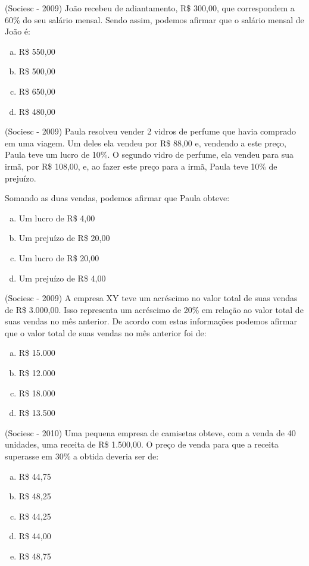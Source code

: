  \begin{exer}
 (Sociesc - 2009) João recebeu de adiantamento, R\$ 300,00, que correspondem a 60\% do seu salário mensal. Sendo assim, podemos afirmar que o salário mensal de João é:
 \begin{enumerate}[a)]
  \item R\$ 550,00
  \item R\$ 500,00
  \item R\$ 650,00
  \item R\$ 480,00
 \end{enumerate}
 \end{exer}
 
 \begin{exer}
 (Sociesc - 2009) Paula resolveu vender 2 vidros de perfume que havia comprado em uma viagem. Um deles ela vendeu por R\$ 88,00 e, vendendo a este preço, Paula teve um lucro de 10\%. O segundo vidro de perfume, ela vendeu para sua irmã, por R\$ 108,00, e, ao fazer este preço para a irmã, Paula teve 10\% de prejuízo.

  Somando as duas vendas, podemos afirmar que Paula obteve:
  \begin{enumerate}[a)]
  \item Um lucro de R\$ 4,00
  \item Um prejuízo de R\$ 20,00
  \item Um lucro de R\$ 20,00
  \item Um prejuízo de R\$ 4,00
 \end{enumerate}
 \end{exer}
 
 \begin{exer}
 (Sociesc - 2009) A empresa XY teve um acréscimo no valor total de suas vendas de R\$ 3.000,00. Isso representa um acréscimo de 20\% em relação ao valor total de suas vendas no mês anterior. De acordo com estas informações podemos afirmar que o valor total de suas vendas no mês anterior foi de:
  \begin{enumerate}[a)]
  \item R\$ 15.000
  \item R\$ 12.000
  \item R\$ 18.000
  \item R\$ 13.500
 \end{enumerate}
 \end{exer} 
 
 \begin{exer}
 (Sociesc - 2010) Uma pequena empresa de camisetas obteve, com a venda de 40 unidades, uma receita de R\$ 1.500,00. O preço de venda para que a receita superasse em 30\% a obtida deveria ser de:
  \begin{enumerate}[a)]
  \item R\$ 44,75
  \item R\$ 48,25
  \item R\$ 44,25
  \item R\$ 44,00
  \item R\$ 48,75
 \end{enumerate}
 \end{exer} 
 
